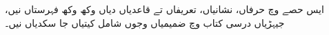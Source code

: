 \documentclass[../../include/open-logic-part]{subfiles}
\begin{document}

\begin{editorial}
ایس حصے وچ حرفاں، نشانیاں، تعریفاں تے قاعدیاں دیاں وکھ وکھ فہرستاں نیں، جیہڑیاں درسی کتاب وچ ضمیمیاں وجوں شامل کیتیاں جا سکدیاں نیں۔
\end{editorial}



\OLEndPartHook
\end{document}
